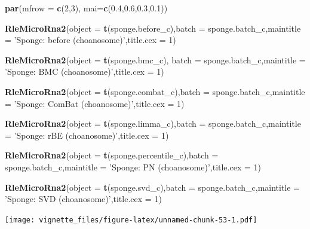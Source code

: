 \documentclass[]{book}
\newenvironment{Shaded}{\begin{snugshade}}{\end{snugshade}}
\newcommand{\KeywordTok}[1]{\textcolor[rgb]{0.13,0.29,0.53}{\textbf{#1}}}
\newcommand{\DataTypeTok}[1]{\textcolor[rgb]{0.13,0.29,0.53}{#1}}
\newcommand{\DecValTok}[1]{\textcolor[rgb]{0.00,0.00,0.81}{#1}}
\newcommand{\FloatTok}[1]{\textcolor[rgb]{0.00,0.00,0.81}{#1}}
\newcommand{\StringTok}[1]{\textcolor[rgb]{0.31,0.60,0.02}{#1}}
\newcommand{\NormalTok}[1]{#1}
\begin{document}
\begin{Shaded}
\begin{Highlighting}[]
\KeywordTok{par}\NormalTok{(}\DataTypeTok{mfrow =} \KeywordTok{c}\NormalTok{(}\DecValTok{2}\NormalTok{,}\DecValTok{3}\NormalTok{), }\DataTypeTok{mai=}\KeywordTok{c}\NormalTok{(}\FloatTok{0.4}\NormalTok{,}\FloatTok{0.6}\NormalTok{,}\FloatTok{0.3}\NormalTok{,}\FloatTok{0.1}\NormalTok{))}

\KeywordTok{RleMicroRna2}\NormalTok{(}\DataTypeTok{object =} \KeywordTok{t}\NormalTok{(sponge.before_c),}\DataTypeTok{batch =}\NormalTok{ sponge.batch_c,}\DataTypeTok{maintitle =} \StringTok{'Sponge: before (choanosome)'}\NormalTok{,}\DataTypeTok{title.cex =} \DecValTok{1}\NormalTok{)}

\KeywordTok{RleMicroRna2}\NormalTok{(}\DataTypeTok{object =} \KeywordTok{t}\NormalTok{(sponge.bmc_c), }\DataTypeTok{batch =}\NormalTok{ sponge.batch_c,}\DataTypeTok{maintitle =} \StringTok{'Sponge: BMC (choanosome)'}\NormalTok{,}\DataTypeTok{title.cex =} \DecValTok{1}\NormalTok{)}

\KeywordTok{RleMicroRna2}\NormalTok{(}\DataTypeTok{object =} \KeywordTok{t}\NormalTok{(sponge.combat_c),}\DataTypeTok{batch =}\NormalTok{ sponge.batch_c,}\DataTypeTok{maintitle =} \StringTok{'Sponge: ComBat (choanosome)'}\NormalTok{,}\DataTypeTok{title.cex =} \DecValTok{1}\NormalTok{)}

  \KeywordTok{RleMicroRna2}\NormalTok{(}\DataTypeTok{object =} \KeywordTok{t}\NormalTok{(sponge.limma_c),}\DataTypeTok{batch =}\NormalTok{ sponge.batch_c,}\DataTypeTok{maintitle =} \StringTok{'Sponge: rBE (choanosome)'}\NormalTok{,}\DataTypeTok{title.cex =} \DecValTok{1}\NormalTok{)}

\KeywordTok{RleMicroRna2}\NormalTok{(}\DataTypeTok{object =} \KeywordTok{t}\NormalTok{(sponge.percentile_c),}\DataTypeTok{batch =}\NormalTok{ sponge.batch_c,}\DataTypeTok{maintitle =} \StringTok{'Sponge: PN (choanosome)'}\NormalTok{,}\DataTypeTok{title.cex =} \DecValTok{1}\NormalTok{)}

\KeywordTok{RleMicroRna2}\NormalTok{(}\DataTypeTok{object =} \KeywordTok{t}\NormalTok{(sponge.svd_c),}\DataTypeTok{batch =}\NormalTok{ sponge.batch_c,}\DataTypeTok{maintitle =} \StringTok{'Sponge: SVD (choanosome)'}\NormalTok{,}\DataTypeTok{title.cex =} \DecValTok{1}\NormalTok{)}
\end{Highlighting}
\end{Shaded}

\texttt{[image: vignette\_files/figure-latex/unnamed-chunk-53-1.pdf]}
\end{document}
